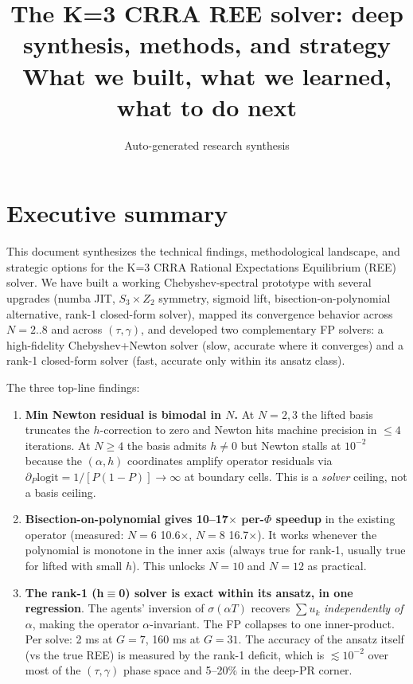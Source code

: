 \documentclass[11pt]{article}
\title{The K=3 CRRA REE solver: deep synthesis, methods, and strategy\\
\large What we built, what we learned, what to do next}
\author{Auto-generated research synthesis}
\date{}
\begin{document}
\maketitle
\tableofcontents
\newpage

\section{Executive summary}

This document synthesizes the technical findings, methodological landscape, and strategic
options for the K=3 CRRA Rational Expectations Equilibrium (REE) solver. We have built a
working Chebyshev-spectral prototype with several upgrades (numba JIT, $S_3\times Z_2$
symmetry, sigmoid lift, bisection-on-polynomial alternative, rank-1 closed-form solver),
mapped its convergence behavior across $N=2..8$ and across $(\tau, \gamma)$, and developed
two complementary FP solvers: a high-fidelity Chebyshev+Newton solver (slow, accurate where
it converges) and a rank-1 closed-form solver (fast, accurate only within its ansatz class).

The three top-line findings:

\begin{enumerate}
\item \textbf{Min Newton residual is bimodal in $N$.} At $N=2,3$ the lifted basis truncates
the $h$-correction to zero and Newton hits machine precision in $\le 4$ iterations.
At $N\ge 4$ the basis admits $h\neq 0$ but Newton stalls at $10^{-2}$ because the
$(\alpha,h)$ coordinates amplify operator residuals via $\partial_P\mathrm{logit}=1/[P(1-P)]\to\infty$
at boundary cells. This is a \emph{solver} ceiling, not a basis ceiling.
\item \textbf{Bisection-on-polynomial gives 10--17$\times$ per-$\Phi$ speedup} in the
existing operator (measured: $N=6$ 10.6$\times$, $N=8$ 16.7$\times$). It works whenever the
polynomial is monotone in the inner axis (always true for rank-1, usually true for lifted
with small $h$). This unlocks $N=10$ and $N=12$ as practical.
\item \textbf{The rank-1 (h$\equiv$0) solver is exact within its ansatz, in one regression}.
The agents' inversion of $\sigma(\alpha T)$ recovers $\sum u_k$ \emph{independently of} $\alpha$,
making the operator $\alpha$-invariant. The FP collapses to one inner-product. Per solve:
2 ms at $G=7$, 160 ms at $G=31$. The accuracy of the ansatz itself (vs the true REE) is
measured by the rank-1 deficit, which is $\lesssim 10^{-2}$ over most of the $(\tau,\gamma)$
phase space and 5--20\% in the deep-PR corner.
\end{enumerate}
\end{document}
